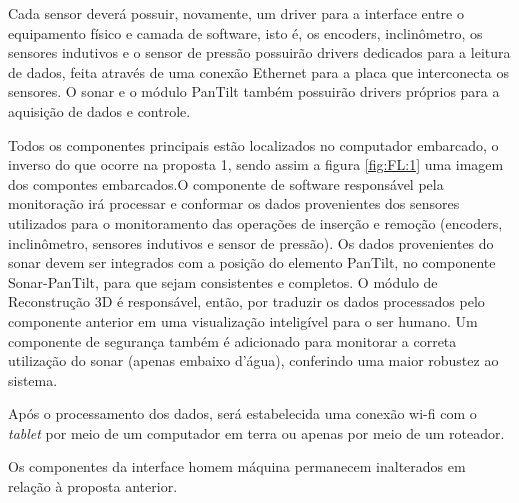 Cada sensor deverá possuir, novamente, um driver para a interface entre o
equipamento físico e camada de software, isto é, os encoders, inclinômetro, os
sensores indutivos e o sensor de pressão possuirão drivers dedicados para a
leitura de dados, feita através de uma conexão Ethernet para a placa que
interconecta os sensores. O sonar e o módulo PanTilt também possuirão drivers
próprios para a aquisição de dados e controle.

Todos os componentes principais estão localizados no computador embarcado, o
inverso do que ocorre na proposta 1, sendo assim a figura \ref{fig:FL:1} uma
imagem dos compontes embarcados.O componente de software responsável pela
monitoração irá processar e conformar os dados provenientes dos sensores
utilizados para o monitoramento das operações de inserção e remoção (encoders,
inclinômetro, sensores indutivos e sensor de pressão). Os dados provenientes do
sonar devem ser integrados com a posição do elemento PanTilt, no componente
Sonar-PanTilt, para que sejam consistentes e completos. O módulo de Reconstrução
3D é responsável, então, por  traduzir os dados processados pelo componente
anterior em uma visualização inteligível para o ser humano. Um componente de
segurança também é adicionado para monitorar a correta utiliza\-ção do sonar
(apenas embaixo d’água), conferindo uma maior robustez ao sistema.

Após o processamento dos dados, será estabelecida uma conexão wi-fi com o \textit{tablet}
por meio de um computador em terra ou
 apenas por meio de um roteador.
 
Os componentes da interface homem máquina permanecem inalterados em relação à
proposta anterior.